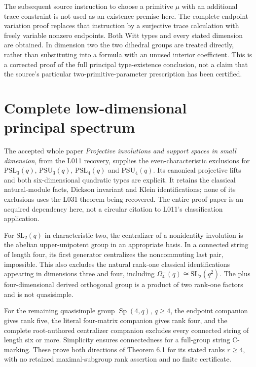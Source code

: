 \documentclass[11pt,a4paper]{article}
\begin{document}
The subsequent source instruction to choose a primitive $\mu$
with an additional trace constraint is not used as an existence
premise here. The complete endpoint-variation proof replaces that
instruction by a surjective trace calculation with freely variable
nonzero endpoints. Both Witt types and every stated dimension
are obtained. In dimension two the two dihedral groups are treated
directly, rather than substituting into a formula with an unused
interior coefficient. This is a corrected proof of the full
principal type-existence conclusion, not a claim that the source's
particular two-primitive-parameter prescription has been certified.

\section{Complete low-dimensional principal spectrum}
The accepted whole paper \emph{Projective involutions and support
spaces in small dimension}, from the L011 recovery, supplies the
even-characteristic exclusions for $\mathrm{PSL}_3(q)$,
$\mathrm{PSU}_3(q)$, $\mathrm{PSL}_4(q)$ and $\mathrm{PSU}_4(q)$.
Its canonical projective lifts and both six-dimensional quadratic
types are explicit. It retains the classical natural-module facts,
Dickson invariant and Klein identifications; none of its exclusions
uses the L031 theorem being recovered. The entire proof paper is
an acquired dependency here, not a circular citation to L011's
classification application.

For $\mathrm{SL}_2(q)$ in characteristic two, the centralizer of
a nonidentity involution is the abelian upper-unipotent group in
an appropriate basis. In a connected string of length four, its
first generator centralizes the noncommuting last pair, impossible.
This also excludes the natural rank-one classical identifications
appearing in dimensions three and four, including
$\Omega^-_4(q)\cong\mathrm{SL}_2(q^2)$.
The plus four-dimensional derived orthogonal group is a product
of two rank-one factors and is not quasisimple.

For the remaining quasisimple group $\operatorname{Sp}(4,q)$,
$q\geq4$, the endpoint companion gives rank five, the literal
four-matrix companion gives rank four, and the complete root-authored
centralizer companion excludes every connected string of length
six or more. Simplicity ensures connectedness for a full-group
string C-marking. These prove both directions of Theorem 6.1
for its stated ranks $r\geq4$, with no retained maximal-subgroup
rank assertion and no finite certificate.
\end{document}
